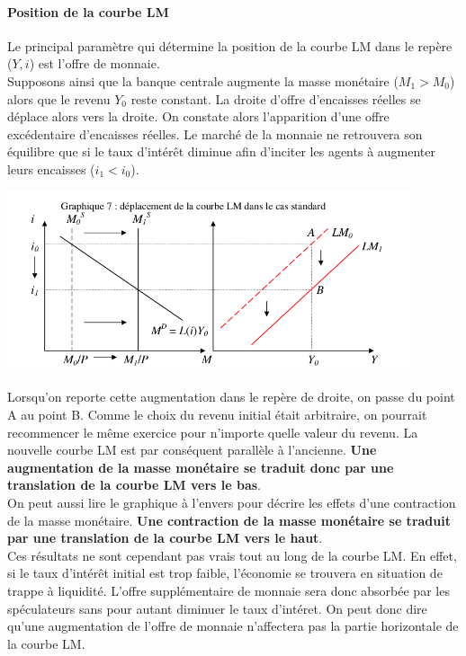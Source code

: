 \documentclass[10pt]{book}
\begin{document}
\paragraph{Position de la courbe LM}
Le principal paramètre qui détermine la position de la courbe LM dans le repère ($Y,i$) est l'offre de monnaie. \\
Supposons ainsi que la banque centrale augmente la masse monétaire ($M_1 > M_0$) alors que le revenu $Y_0$ reste constant. La droite d'offre d'encaisses réelles se déplace alors vers la droite. On constate alors l'apparition d'une offre excédentaire d'encaisses réelles. Le marché de la monnaie ne retrouvera son équilibre que si le taux d'intérêt diminue afin d'inciter les agents à augmenter leurs encaisses ($i_1 < i_0$).
\begin{center}
  \includegraphics[width=12cm]{graph31.png}
\end{center}
Lorsqu'on reporte cette augmentation dans le repère de droite, on passe du point A au point B. Comme le choix du revenu initial était arbitraire, on pourrait recommencer le même exercice pour n'importe quelle valeur du revenu. La nouvelle courbe LM est par conséquent parallèle à l'ancienne. \textbf{Une augmentation de la masse monétaire se traduit donc par une translation de la courbe LM vers le bas}. \\
On peut aussi lire le graphique à l'envers pour décrire les effets d'une contraction de la masse monétaire. \textbf{Une contraction de la masse monétaire se traduit par une translation de la courbe LM vers le haut}. \\
Ces résultats ne sont cependant pas vrais tout au long de la courbe LM. En effet, si le taux d'intérêt initial est trop faible, l'économie se trouvera en situation de trappe à liquidité. L'offre supplémentaire de monnaie sera donc absorbée par les spéculateurs sans pour autant diminuer le taux d'intéret. On peut donc dire qu'une augmentation de l'offre de monnaie n'affectera pas la partie horizontale de la courbe LM.
\end{document}
